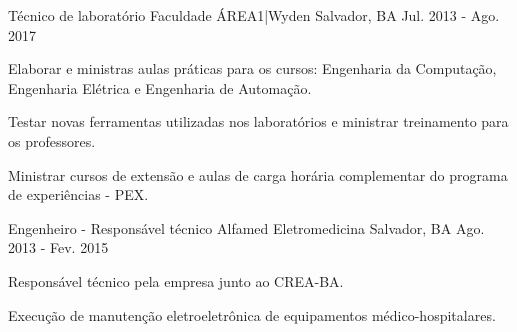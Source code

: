 \begin{cventries}
    
  \cventry
    {Técnico de laboratório} %
    {Faculdade ÁREA1|Wyden} %
    {Salvador, BA} %
    {Jul. 2013 - Ago. 2017} %
    {
      \begin{cvitems} %
        \item {Elaborar e ministras aulas práticas para os cursos: Engenharia da Computação, Engenharia Elétrica e Engenharia de Automação.}
        \item {Testar novas ferramentas utilizadas nos laboratórios e ministrar treinamento para os professores.}
        \item { Ministrar cursos de extensão e aulas de carga horária complementar do programa de experiências - PEX.}
      \end{cvitems}
    }

  \cventry
    {Engenheiro - Responsável técnico} %
    {Alfamed Eletromedicina} %
    {Salvador, BA} %
    {Ago. 2013 - Fev. 2015} %
    {
      \begin{cvitems} %
        \item {Responsável técnico pela empresa junto ao CREA-BA.}
        \item {Execução de manutenção eletroeletrônica de equipamentos médico-hospitalares.}
      \end{cvitems}
    }
    


\end{cventries}
